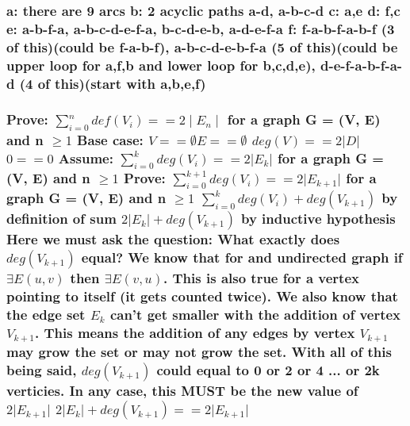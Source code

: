\documentclass{article}
\begin{document}
\setcounter{tocdepth}{3}

\setcounter{section}{9}
\setcounter{subsection}{2}
\setcounter{subsubsection}{0}
\subsubsection{
a: there are 9 arcs\newline
b: 2 acyclic paths a-d, a-b-c-d\newline
c: a,e\newline
d: f,c\newline
e: a-b-f-a, a-b-c-d-e-f-a, b-c-d-e-b, a-d-e-f-a\newline
f: f-a-b-f-a-b-f (3 of this)(could be f-a-b-f), a-b-c-d-e-b-f-a (5 of this)(could be upper loop for a,f,b and lower loop for b,c,d,e), d-e-f-a-b-f-a-d (4 of this)(start with a,b,e,f)
}

\setcounter{section}{9}
\setcounter{subsection}{3}
\setcounter{subsubsection}{4}
\subsubsection{
Prove: $ \sum\limits_{i=0}^n def(V_i) == 2 \mid E_n \mid$ for a graph G = (V, E) and n $\geq{1}$ \newline
Base case:\newline
$V == \emptyset E == \emptyset $\newline
$deg( V) == 2 \vert D \vert$ \newline
$0 == 0$\newline
Assume: $ \sum\limits_{i=0}^k deg(V_i) == 2\vert E_k\vert$  for a graph G = (V, E) and n $\geq{1}$\newline
Prove: $ \sum\limits_{i=0}^{k+1} deg(V_i) == 2\vert E_{k+1} \vert$  for a graph G = (V, E) and n $\geq{1}$\newline
$ \sum\limits_{i=0}^{k} deg(V_i) + deg(V_{k+1}) $ by definition of sum \newline
$ 2 \vert E_k\vert + deg(V_{k+1}) $ by inductive hypothesis\newline
Here we must ask the question: What exactly does $deg(V_{k+1})$ equal? We know that for and undirected graph if $\exists E(u,v)$ then $\exists E(v,u)$. This is also true for a vertex pointing to itself (it gets counted twice). We also know that the edge set $E_k$ can't get smaller with the addition of vertex $V_{k+1}$. This means the addition of any edges by vertex $V_{k+1}$ may grow the set or may not grow the set. With all of this being said, $deg(V_{k+1})$ could equal to 0 or 2 or 4 ... or 2k verticies. In any case, this MUST be the new value of $ 2 \vert E_{k+1}\vert $\newline
$ 2 \vert E_k\vert + deg(V_{k+1})  == 2\vert E_{k+1} \vert$
}
\end{document}

